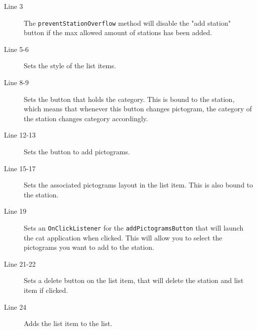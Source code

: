 \begin{description}
\item[Line 3] The \lstinline|preventStationOverflow| method will disable the "add station" button if the max allowed amount of stations has been added.
\item[Line 5-6] Sets the style of the list items.
\item[Line 8-9] Sets the button that holds the category. This is bound to the station, which means that whenever this button changes pictogram, the category of the station changes category accordingly.
\item[Line 12-13] Sets the button to add pictograms.
\item[Line 15-17] Sets the associated pictograms layout in the list item. This is also bound to the station.
\item[Line 19] Sets an \lstinline|OnClickListener| for the \lstinline|addPictogramsButton| that will launch the \ac{cat} application when clicked. This will allow you to select the pictograms you want to add to the station.
\item[Line 21-22] Sets a delete button on the list item, that will delete the station and list item if clicked.
\item[Line 24] Adds the list item to the list.
\end{description}

